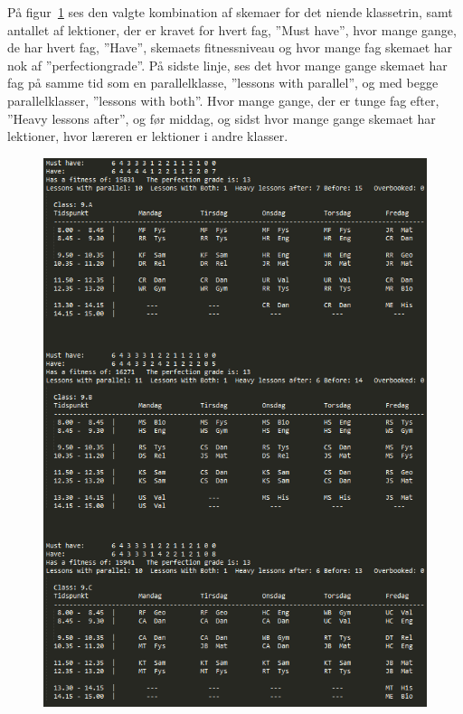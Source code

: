 På figur~\ref{fig:test} ses den valgte kombination af skemaer for det niende klassetrin, samt antallet af lektioner, der er kravet for hvert fag, ''Must have'', hvor mange gange, de har hvert fag, ''Have'', skemaets fitnessniveau og hvor mange fag skemaet har nok af ''perfectiongrade''. På sidste linje, ses det hvor mange gange skemaet har fag på samme tid som en parallelklasse, ''lessons with parallel'', og med begge parallelklasser, ''lessons with both''. Hvor mange gange, der er tunge fag efter, ''Heavy lessons after'', og før middag, og sidst hvor mange gange skemaet har lektioner, hvor læreren er lektioner i andre klasser.

\begin{figure}[!h]
  \includegraphics[scale = 1]{partials/graphics/programtestres.png}
  \caption{}
  \label{fig:test}
\end{figure}